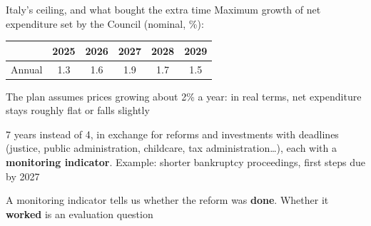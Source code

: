 \documentclass[aspectratio=169,xcolor=table]{beamer}
\begin{document}
\begin{frame}{Italy's ceiling, and what bought the extra time}
\footnotesize
Maximum growth of net expenditure set by the Council (nominal, \%):
\vspace{0.05cm}

\centering\scriptsize
\begin{tabular}{lccccc}
\toprule
 & 2025 & 2026 & 2027 & 2028 & 2029 \\
\midrule
Annual & 1.3 & 1.6 & 1.9 & 1.7 & 1.5 \\
\bottomrule
\end{tabular}
\vspace{0.15cm}

\raggedright\footnotesize
\bi
  \item The plan assumes prices growing about 2\% a year: in real terms, net expenditure stays roughly flat or falls slightly
  \item 7 years instead of 4, in exchange for reforms and investments with deadlines (justice, public administration, childcare, tax administration\ldots), each with a \textbf{monitoring indicator}. Example: shorter bankruptcy proceedings, first steps due by 2027
\ei
\begin{block}{}
A monitoring indicator tells us whether the reform was \textbf{done}. Whether it \textbf{worked} is an evaluation question
\end{block}
\end{frame}
\end{document}
